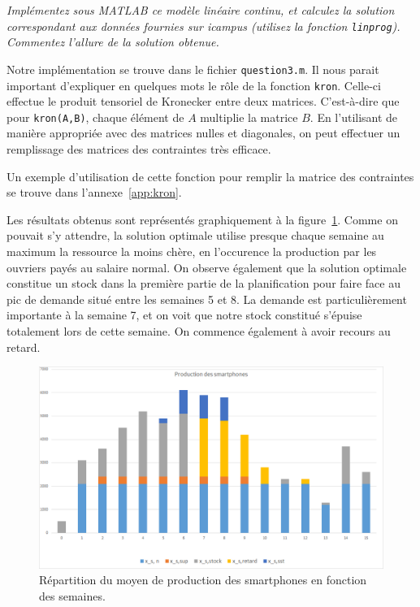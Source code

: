 \question %
\emph{Implémentez sous MATLAB ce modèle linéaire continu,
et calculez la solution correspondant aux données fournies sur icampus
(utilisez la fonction \texttt{linprog}).
Commentez l'allure de la solution obtenue.}

Notre implémentation se trouve dans le fichier \texttt{question3.m}.
Il nous parait important d'expliquer en quelques mots le r\^ole
de la fonction \texttt{kron}.
Celle-ci effectue le produit tensoriel de Kronecker entre deux matrices.
C'est-à-dire que pour \texttt{kron(A,B)},
chaque élément de $A$ multiplie la matrice $B$.
En l'utilisant de manière appropriée avec des matrices nulles et diagonales,
on peut effectuer un remplissage des matrices des contraintes très efficace.

Un exemple d'utilisation de cette fonction pour remplir la matrice
des contraintes se trouve dans l'annexe~\ref{app:kron}.

Les résultats obtenus sont représentés graphiquement
à la figure~\ref{fig:grapheProduction}.
Comme on pouvait s'y attendre, la solution optimale utilise presque chaque
semaine au maximum la ressource la moins chère,
en l'occurence la production par les ouvriers payés au salaire normal.
On observe également que la solution optimale constitue un stock dans la première partie de la planification pour faire face au pic de demande
situé entre les semaines 5 et 8.
La demande est particulièrement importante à la semaine 7,
et on voit que notre stock constitué s'épuise totalement lors de cette semaine.
On commence également à avoir recours au retard.

\begin{figure}[H]
  \begin{center}
    \includegraphics[scale = 0.8]{img/grapheProduction.png}
	  \caption{Répartition du moyen de production des smartphones en fonction des semaines.}
	  \label{fig:grapheProduction}
  \end{center}
\end{figure}

